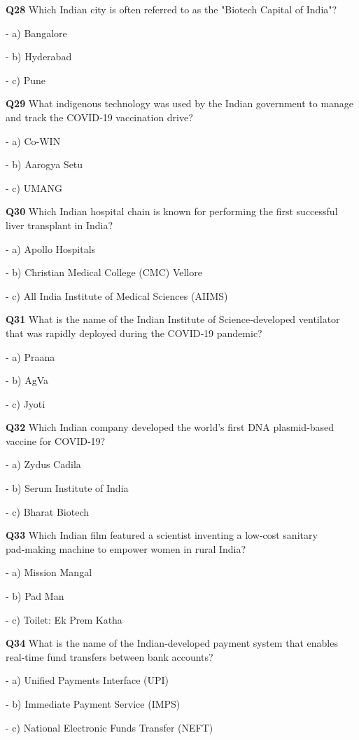\textbf{Q28} Which Indian city is often referred to as the "Biotech Capital of India"?\par
\quad - a) Bangalore\par
\quad - b) Hyderabad\par
\quad - c) Pune\par

\textbf{Q29} What indigenous technology was used by the Indian government to manage and track the COVID‑19 vaccination drive?\par
\quad - a) Co‑WIN\par
\quad - b) Aarogya Setu\par
\quad - c) UMANG\par

\textbf{Q30} Which Indian hospital chain is known for performing the first successful liver transplant in India?\par
\quad - a) Apollo Hospitals\par
\quad - b) Christian Medical College (CMC) Vellore\par
\quad - c) All India Institute of Medical Sciences (AIIMS)\par

\textbf{Q31} What is the name of the Indian Institute of Science‑developed ventilator that was rapidly deployed during the COVID‑19 pandemic?\par
\quad - a) Praana\par
\quad - b) AgVa\par
\quad - c) Jyoti\par

\textbf{Q32} Which Indian company developed the world's first DNA plasmid‑based vaccine for COVID‑19?\par
\quad - a) Zydus Cadila\par
\quad - b) Serum Institute of India\par
\quad - c) Bharat Biotech\par

\textbf{Q33} Which Indian film featured a scientist inventing a low‑cost sanitary pad‑making machine to empower women in rural India?\par
\quad - a) Mission Mangal\par
\quad - b) Pad Man\par
\quad - c) Toilet: Ek Prem Katha\par

\textbf{Q34} What is the name of the Indian‑developed payment system that enables real‑time fund transfers between bank accounts?\par
\quad - a) Unified Payments Interface (UPI)\par
\quad - b) Immediate Payment Service (IMPS)\par
\quad - c) National Electronic Funds Transfer (NEFT)\par

